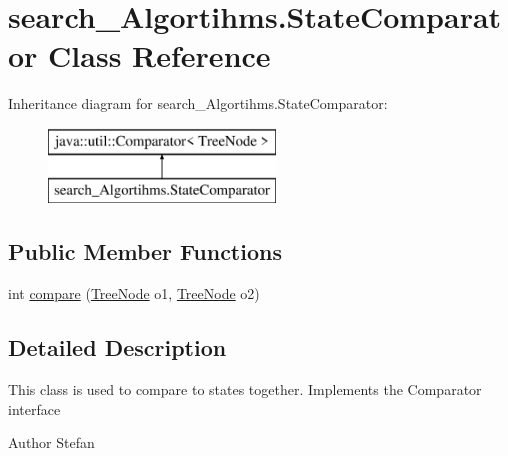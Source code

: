 \hypertarget{classsearch___algortihms_1_1_state_comparator}{\section{search\+\_\+\+Algortihms.\+State\+Comparator Class Reference}
\label{classsearch___algortihms_1_1_state_comparator}
}
Inheritance diagram for search\+\_\+\+Algortihms.\+State\+Comparator\+:\begin{figure}[H]
\begin{center}
\leavevmode
\includegraphics[height=2.000000cm]{da/da3/classsearch___algortihms_1_1_state_comparator}
\end{center}
\end{figure}
\subsection*{Public Member Functions}
\begin{DoxyCompactItemize}
\item 
int \hyperlink{classsearch___algortihms_1_1_state_comparator_aa65983963c3cf964f85f9e4183122a7f}{compare} (\hyperlink{class_search_tree_1_1_tree_node}{Tree\+Node} o1, \hyperlink{class_search_tree_1_1_tree_node}{Tree\+Node} o2)
\end{DoxyCompactItemize}


\subsection{Detailed Description}
This class is used to compare to states together. Implements the Comparator interface

\begin{DoxyAuthor}{Author}
Stefan 
\end{DoxyAuthor}


